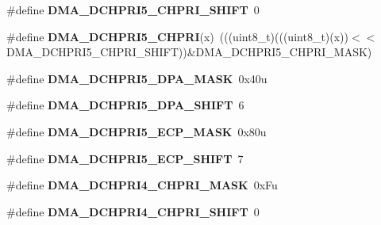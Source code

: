 \begin{DoxyCompactItemize}
\item 
\#define {\bfseries D\+M\+A\+\_\+\+D\+C\+H\+P\+R\+I5\+\_\+\+C\+H\+P\+R\+I\+\_\+\+S\+H\+I\+FT}~0\hypertarget{group__DMA__Register__Masks_gad92d72515f8f70aeaa7035139b95021e}{}\label{group__DMA__Register__Masks_gad92d72515f8f70aeaa7035139b95021e}

\item 
\#define {\bfseries D\+M\+A\+\_\+\+D\+C\+H\+P\+R\+I5\+\_\+\+C\+H\+P\+RI}(x)~(((uint8\+\_\+t)(((uint8\+\_\+t)(x))$<$$<$D\+M\+A\+\_\+\+D\+C\+H\+P\+R\+I5\+\_\+\+C\+H\+P\+R\+I\+\_\+\+S\+H\+I\+FT))\&D\+M\+A\+\_\+\+D\+C\+H\+P\+R\+I5\+\_\+\+C\+H\+P\+R\+I\+\_\+\+M\+A\+SK)\hypertarget{group__DMA__Register__Masks_ga66cfbbc9f5e4f86305937b1fffdc77df}{}\label{group__DMA__Register__Masks_ga66cfbbc9f5e4f86305937b1fffdc77df}

\item 
\#define {\bfseries D\+M\+A\+\_\+\+D\+C\+H\+P\+R\+I5\+\_\+\+D\+P\+A\+\_\+\+M\+A\+SK}~0x40u\hypertarget{group__DMA__Register__Masks_ga7b37f0484175d7e23fd9827d59487a9b}{}\label{group__DMA__Register__Masks_ga7b37f0484175d7e23fd9827d59487a9b}

\item 
\#define {\bfseries D\+M\+A\+\_\+\+D\+C\+H\+P\+R\+I5\+\_\+\+D\+P\+A\+\_\+\+S\+H\+I\+FT}~6\hypertarget{group__DMA__Register__Masks_ga7b735d044c9d0e93aeed7f848065dabd}{}\label{group__DMA__Register__Masks_ga7b735d044c9d0e93aeed7f848065dabd}

\item 
\#define {\bfseries D\+M\+A\+\_\+\+D\+C\+H\+P\+R\+I5\+\_\+\+E\+C\+P\+\_\+\+M\+A\+SK}~0x80u\hypertarget{group__DMA__Register__Masks_ga8d8a7a23ba67b0dd3830251a3ce561d3}{}\label{group__DMA__Register__Masks_ga8d8a7a23ba67b0dd3830251a3ce561d3}

\item 
\#define {\bfseries D\+M\+A\+\_\+\+D\+C\+H\+P\+R\+I5\+\_\+\+E\+C\+P\+\_\+\+S\+H\+I\+FT}~7\hypertarget{group__DMA__Register__Masks_ga3872194e99a98cdae0e7378a3570774c}{}\label{group__DMA__Register__Masks_ga3872194e99a98cdae0e7378a3570774c}

\item 
\#define {\bfseries D\+M\+A\+\_\+\+D\+C\+H\+P\+R\+I4\+\_\+\+C\+H\+P\+R\+I\+\_\+\+M\+A\+SK}~0x\+Fu\hypertarget{group__DMA__Register__Masks_ga87796e0046313ec4aaf1b839a5e60dcf}{}\label{group__DMA__Register__Masks_ga87796e0046313ec4aaf1b839a5e60dcf}

\item 
\#define {\bfseries D\+M\+A\+\_\+\+D\+C\+H\+P\+R\+I4\+\_\+\+C\+H\+P\+R\+I\+\_\+\+S\+H\+I\+FT}~0\hypertarget{group__DMA__Register__Masks_gad164e5f8091a94ef38abd6570d97b761}{}\label{group__DMA__Register__Masks_gad164e5f8091a94ef38abd6570d97b761}


\end{DoxyCompactItemize}
